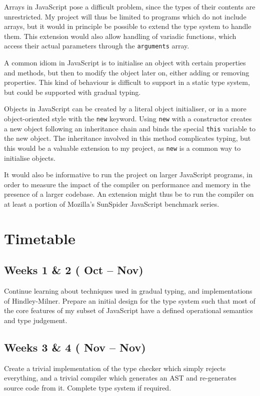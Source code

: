 \documentclass{article}
\begin{document}
		Arrays in JavaScript pose a difficult problem, since the types of their
		contents are unrestricted. My project will thus be limited to programs
		which do not include arrays, but it would in principle be possible to
		extend the type system to handle them. This extension would also allow
		handling of variadic functions, which access their actual parameters
		through the \texttt{arguments} array.

		A common idiom in JavaScript is to initialise an object with certain
		properties and methods, but then to modify the object later on, either
		adding or removing properties. This kind of behaviour is difficult to
		support in a static type system, but could be supported with gradual
		typing.

		Objects in JavaScript can be created by a literal object initialiser,
		or in a more object-oriented style with the \texttt{new} keyword. Using
		\texttt{new} with a constructor creates a new object following an
		inheritance chain and binds the special \texttt{this} variable to the
		new object. The inheritance involved in this method complicates typing,
		but this would be a valuable extension to my project, as \texttt{new}
		is a common way to initialise objects.

		It would also be informative to run the project on larger JavaScript
		programs, in order to measure the impact of the compiler on performance
		and memory in the presence of a larger codebase. An extension might
		thus be to run the compiler on at least a portion of Mozilla's
		SunSpider JavaScript benchmark series.

	\section{Timetable}\label{prop-timetable}

		\subsection*{Weeks 1 \& 2 ( Oct --  Nov)}
		Continue learning about techniques used in gradual typing, and
		implementations of Hindley-Milner. Prepare an initial design for the
		type system such that most of the core features of my subset of
		JavaScript have a defined operational semantics and type judgement.

		\subsection*{Weeks 3 \& 4 ( Nov --  Nov)}
		Create a trivial implementation of the type checker which simply
		rejects everything, and a trivial compiler which generates an AST and
		re-generates source code from it. Complete type system if required.
\end{document}
